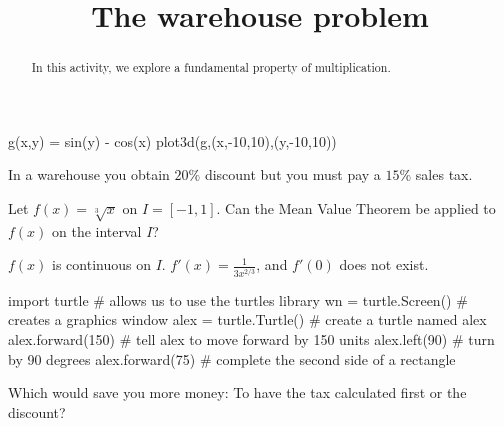 \documentclass[handout]{ximera}
\title{The warehouse problem}
\begin{document}
\begin{abstract}
In this activity, we explore a fundamental property of multiplication. 
\end{abstract}
\maketitle


\begin{sageCell}
g(x,y) = sin(y) - cos(x)
  plot3d(g,(x,-10,10),(y,-10,10))
\end{sageCell}



In a warehouse you obtain $20\%$ discount but you must pay a $15\%$
sales tax.

\begin{example}
Let $f(x)=\sqrt[3]{x}$ on $I=[-1,1]$. Can the Mean Value Theorem be applied to $f(x)$ on the interval $I$?

\begin{multipleChoice}
\end{multipleChoice}

\begin{explanation}
  \begin{expandable}
    $f(x)$ is continuous on $I$. $f'(x)=\frac{1}{3x^{2/3}}$, and $f'(0)$ does not exist.
  \end{expandable}
\end{explanation}
\end{example}


\begin{python}
  import turtle               # allows us to use the turtles library
  wn = turtle.Screen()        # creates a graphics window
  alex = turtle.Turtle()      # create a turtle named alex
  alex.forward(150)           # tell alex to move forward by 150 units
  alex.left(90)               # turn by 90 degrees
  alex.forward(75)            # complete the second side of a rectangle
\end{python}



\begin{question}
Which would save you more money: To have the tax calculated first or
the discount?
\begin{explanation}
\begin{multipleChoice}
\end{multipleChoice}
\end{explanation}
\end{question}
\end{document}

